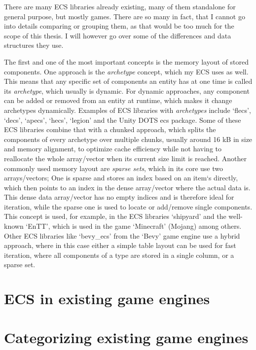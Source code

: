 There are many ECS libraries already existing, many of them standalone for general purpose, but mostly games. There are so many in fact, that I cannot go into details comparing or grouping them, as that would be too much for the scope of this thesis. I will however go over some of the differences and data structures they use.

The first and one of the most important concepts is the memory layout of stored components. One approach is the \textit{archetype} concept, which my ECS uses as well. This means that any specific set of components an entity has at one time is called its \textit{archetype}, which usually is dynamic. For dynamic approaches, any component can be added or removed from an entity at runtime, which makes it change archetypes dynamically. Examples of ECS libraries with \textit{archetypes} include `flecs', `decs', `apecs', `hecs', `legion' and the Unity DOTS ecs package. Some of these ECS libraries combine that with a chunked approach, which splits the components of every archetype over multiple chunks, usually around 16 kB in size and memory alignment, to optimize cache efficiency while not having to reallocate the whole array/vector when its current size limit is reached. Another commonly used memory layout are \textit{sparse sets}, which in its core use two arrays/vectors; One is sparse and stores an index based on an item`s directly, which then points to an index in the dense array/vector where the actual data is. This dense data array/vector has no empty indices and is therefore ideal for iteration, while the sparse one is used to locate or add/remove single components. This concept is used, for example, in the ECS libraries `shipyard' and the well-known `EnTT', which is used in the game `Minecraft' (Mojang) among others. Other ECS libraries like `bevy_ecs' from the `Bevy' game engine use a hybrid approach, where in this case either a simple table layout can be used for fast iteration, where all components of a type are stored in a single column, or a sparse set.




\section{ECS in existing game engines}



\section{Categorizing existing game engines}


